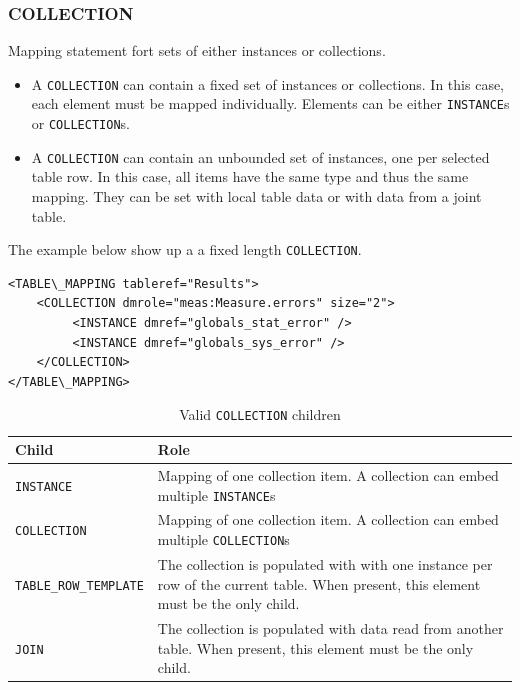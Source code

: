 \documentclass[11pt,a4paper]{ivoa}
\begin{document}
%
%

\subsubsection{COLLECTION}

Mapping statement fort sets of either instances or collections.

\begin{itemize}
    \item A \texttt{COLLECTION} can contain a fixed set of instances or collections. 
            In this case, each element must be mapped individually.  
            Elements can be either \texttt{INSTANCE}s or \texttt{COLLECTION}s.
    \item A \texttt{COLLECTION} can contain an unbounded set of instances, one per selected table row. 
            In this case, all items have the same type and thus the same mapping. 
           They can be set with local table  data or with data from a joint table.
 \end{itemize}

The example below show up a a fixed length \texttt{COLLECTION}.

\begin{lstlisting}[caption={\texttt{COLLECTION} example},style=XML]
<TABLE\_MAPPING tableref="Results">
    <COLLECTION dmrole="meas:Measure.errors" size="2">
         <INSTANCE dmref="globals_stat_error" />         
         <INSTANCE dmref="globals_sys_error" />
    </COLLECTION>
</TABLE\_MAPPING>
\end{lstlisting}

\begin{table}[!htbp]
\small
\centering
\begin{tabulary}{\linewidth}{|L|J|}
       \hline 
           \textbf{Child} &
           \textbf{Role}\\
       \hline  \hline
           \texttt{INSTANCE}    & 
           Mapping of one collection item. A collection can embed multiple \texttt{INSTANCE}s \\              
       \hline  
           \texttt{COLLECTION}    & 
           Mapping of one collection item. A collection can embed multiple \texttt{COLLECTION}s \\              
       \hline  
           \texttt{TABLE\_ROW\_TEMPLATE}    & 
          The collection is populated with with one instance per row of the current table. When present, this element must be the only child. \\       
       \hline  
          \texttt{JOIN}    & 
         The collection is populated with data read from another table. When present, this element must be the only child.\\      
       \hline 
\end{tabulary}
\caption{Valid  \texttt{COLLECTION} children} 
\label{tbl:coll-children}
\end{table}
\end{document}
